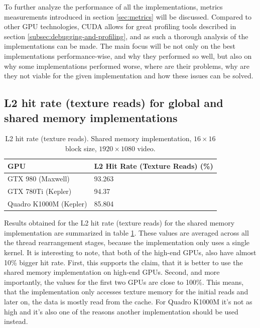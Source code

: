 To further analyze the performance of all the implementations, metrics measurements introduced in section \ref{sec:metrics} will be discussed. Compared to other GPU technologies, CUDA allows for great profiling tools described in section \ref{subsec:debugging-and-profiling}, and as such a thorough analysis of the implementations can be made. The main focus will be not only on the best implementations performance-wise, and why they performed so well, but also on why some implementations performed worse, where are their problems, why are they not viable for the given implementation and how these issues can be solved.

\subsection{L2 hit rate (texture reads) for global and shared memory implementations}\label{subsec:prof-l2-hit-rate}

\begin{table}[htbp]
\centering
\begin{tabular}{| l | l |}
\hline
GPU & L2 Hit Rate (Texture Reads) (\%) \\
\hline
GTX 980 (Maxwell) & 93.263 \\
\hline
GTX 780Ti (Kepler) & 94.37 \\
\hline
Quadro K1000M (Kepler) & 85.804 \\
\hline
\end{tabular}
\caption{L2 hit rate (texture reads). Shared memory implementation, $16 \times 16$ block size, $1920 \times 1080$ video.}
\label{tab:l2-hit-rate-shared}
\end{table}

Results obtained for the L2 hit rate (texture reads) for the shared memory implementation are summarized in table \ref{tab:l2-hit-rate-shared}. These values are averaged across all the thread rearrangement stages, because the implementation only uses a single kernel. It is interesting to note, that both of the high-end GPUs, also have almost 10\% bigger hit rate. First, this supports the claim, that it is better to use the shared memory implementation on high-end GPUs. Second, and more importantly, the values for the first two GPUs are close to 100\%. This means, that the implementation only accesses texture memory for the initial reads and later on, the data is mostly read from the cache. For Quadro K1000M it's not as high and it's also one of the reasons another implementation should be used instead.

